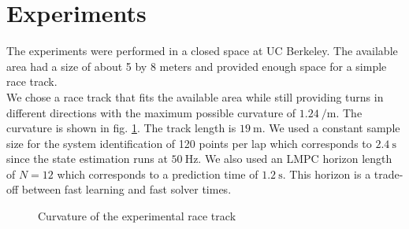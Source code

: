 \section{Experiments}
The experiments were performed in a closed space at UC Berkeley. The available area had a size of about 5 by 8 meters and provided enough space for a simple race track.\\
We chose a race track that fits the available area while still providing turns in different directions with the maximum possible curvature of $\SI{1.24}{\per\meter}$. The curvature is shown in fig. \ref{fig:exp_curv}. The track length is $\SI{19}{\meter}$.
We used a constant sample size for the system identification of 120 points per lap which corresponds to $\SI{2.4}{\second}$ since the state estimation runs at $\SI{50}{\hertz}$. We also used an LMPC horizon length of $N=12$ which corresponds to a prediction time of $\SI{1.2}{\second}$. This horizon is a trade-off between fast learning and fast solver times.
\begin{figure}[ht]
    \centering
      
    \caption{Curvature of the experimental race track}
    \label{fig:exp_curv}
\end{figure}

